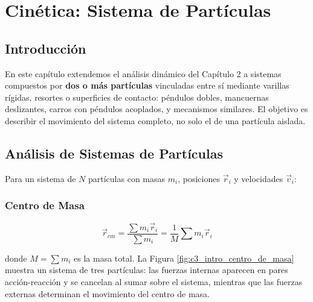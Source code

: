 
\chapter{Cinética: Sistema de Partículas}

\section*{Introducción}

En este capítulo extendemos el análisis dinámico del Capítulo 2 a sistemas compuestos por \textbf{dos o más partículas} vinculadas entre sí mediante varillas rígidas, resortes o superficies de contacto: péndulos dobles, mancuernas deslizantes, carros con péndulos acoplados, y mecanismos similares. El objetivo es describir el movimiento del sistema completo, no solo el de una partícula aislada.

\section{Análisis de Sistemas de Partículas}

Para un sistema de $N$ partículas con masas $m_i$, posiciones $\vec{r}_i$ y velocidades $\vec{v}_i$:

\subsection*{Centro de Masa}

$$\vec{r}_{cm} = \frac{\sum m_i \vec{r}_i}{\sum m_i} = \frac{1}{M}\sum m_i \vec{r}_i$$

donde $M = \sum m_i$ es la masa total. La Figura \ref{fig:c3_intro_centro_de_masa} muestra un sistema de tres partículas: las fuerzas internas aparecen en pares acción-reacción y se cancelan al sumar sobre el sistema, mientras que las fuerzas externas determinan el movimiento del centro de masa.

